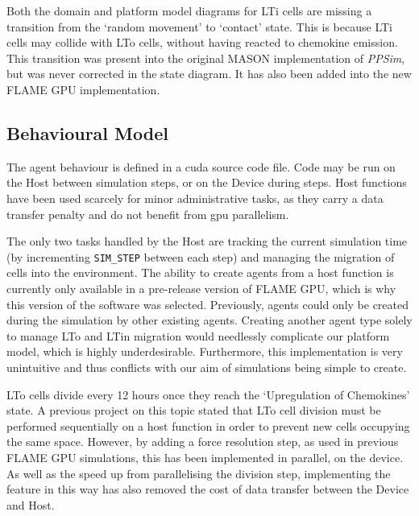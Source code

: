 \documentclass{UoYCSproject}
\begin{document}
Both the domain and platform model diagrams for \gls{LTi} cells are missing a transition from the `random movement' to `contact' state.
This is because \gls{LTi} cells may collide with \gls{LTo} cells, without having reacted to chemokine emission.
This transition was present into the original \gls{MASON} implementation of \textit{PPSim}, but was never corrected in the state diagram.
It has also been added into the new \gls{FLAME GPU} implementation.

\subsection{Behavioural Model}
The agent behaviour is defined in a \gls{cuda} source code file.
Code may be run on the \gls{Host} between simulation steps, or on the \gls{Device} during steps.
\gls{Host} functions have been used scarcely for minor administrative tasks, as they carry a data transfer penalty and do not benefit from \gls{gpu} parallelism.

The only two tasks handled by the \gls{Host} are tracking the current simulation time (by incrementing \texttt{SIM\_STEP} between each step) and managing the migration of cells into the environment.
The ability to create agents from a host function is currently only available in a pre-release version of \gls{FLAME GPU}, which is why this version of the software was selected.
Previously, agents could only be created during the simulation by other existing agents.
Creating another agent type solely to manage \gls{LTo} and \gls{LTin} migration would needlessly complicate our platform model, which is highly underdesirable.
Furthermore, this implementation is very unintuitive and thus conflicts with our aim of simulations being simple to create.

\gls{LTo} cells divide every 12 hours once they reach the `Upregulation of Chemokines' state.
A previous project on this topic stated that \gls{LTo} cell division must be performed sequentially on a host function in order to prevent new cells occupying the same space\cite{phil_diss}.
However, by adding a force resolution step, as used in previous \gls{FLAME GPU} simulations\cite{flame_keratinocyte}, this has been implemented in parallel, on the device.
As well as the speed up from parallelising the division step, implementing the feature in this way has also removed the cost of data transfer between the \gls{Device} and \gls{Host}.
\end{document}
